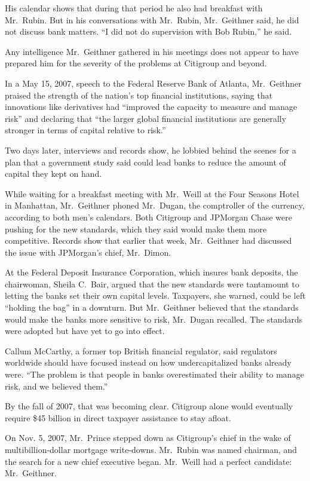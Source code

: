\documentclass[12pt,a4paper,onecolumn]{article}
\begin{document}
His calendar shows that during that period he also had breakfast with Mr.~Rubin. But in his
conversations with Mr.~Rubin, Mr.~Geithner said, he did not discuss bank matters. ``I did not do
supervision with Bob Rubin,'' he said.

Any intelligence Mr.~Geithner gathered in his meetings does not appear to have prepared him for the
severity of the problems at Citigroup and beyond.

In a May 15, 2007, speech to the Federal Reserve Bank of Atlanta, Mr.~Geithner praised the strength
of the nation's top financial institutions, saying that innovations like derivatives had ``improved
the capacity to measure and manage risk'' and declaring that ``the larger global financial
institutions are generally stronger in terms of capital relative to risk.''

Two days later, interviews and records show, he lobbied behind the scenes for a plan that a
government study said could lead banks to reduce the amount of capital they kept on hand.

While waiting for a breakfast meeting with Mr.~Weill at the Four Seasons Hotel in Manhattan,
Mr.~Geithner phoned Mr.~Dugan, the comptroller of the currency, according to both men's calendars.
Both Citigroup and JPMorgan Chase were pushing for the new standards, which they said would make
them more competitive. Records show that earlier that week, Mr.~Geithner had discussed the issue
with JPMorgan's chief, Mr.~Dimon.

At the Federal Deposit Insurance Corporation, which insures bank deposits, the chairwoman, Sheila
C.~Bair, argued that the new standards were tantamount to letting the banks set their own capital
levels. Taxpayers, she warned, could be left ``holding the bag'' in a downturn. But Mr.~Geithner
believed that the standards would make the banks more sensitive to risk, Mr.~Dugan recalled. The
standards were adopted but have yet to go into effect.

Callum McCarthy, a former top British financial regulator, said regulators worldwide should have
focused instead on how undercapitalized banks already were. ``The problem is that people in banks
overestimated their ability to manage risk, and we believed them.''

By the fall of 2007, that was becoming clear. Citigroup alone would eventually require \$45 billion
in direct taxpayer assistance to stay afloat.

On Nov. 5, 2007, Mr.~Prince stepped down as Citigroup's chief in the wake of multibillion-dollar
mortgage write-downs. Mr.~Rubin was named chairman, and the search for a new chief executive began.
Mr.~Weill had a perfect candidate: Mr.~Geithner.
\end{document}
